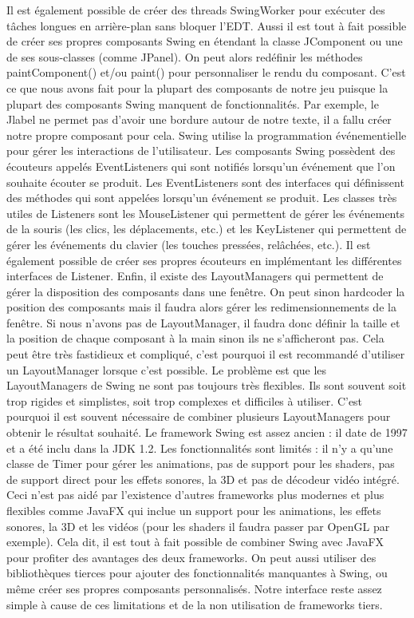 \documentclass{article}
\begin{document}
    Il est également possible de créer des threads SwingWorker pour exécuter des tâches longues en arrière-plan sans bloquer l'EDT.
    Aussi il est tout à fait possible de créer ses propres composants Swing en étendant la classe JComponent ou une de ses sous-classes (comme JPanel).
    On peut alors redéfinir les méthodes paintComponent() et/ou paint() pour personnaliser le rendu du composant.
    C'est ce que nous avons fait pour la plupart des composants de notre jeu puisque la plupart des composants Swing manquent de fonctionnalités.
    Par exemple, le Jlabel ne permet pas d'avoir une bordure autour de notre texte, il a fallu créer notre propre composant pour cela.
    \newline
    Swing utilise la programmation événementielle pour gérer les interactions de l'utilisateur.
    Les composants Swing possèdent des écouteurs appelés EventListeners qui sont notifiés lorsqu'un événement que l'on souhaite écouter se produit.
    Les EventListeners sont des interfaces qui définissent des méthodes qui sont appelées lorsqu'un événement se produit.
    Les classes très utiles de Listeners sont les MouseListener qui permettent de gérer les événements de la souris (les clics, les déplacements, etc.) et les KeyListener qui permettent de gérer les événements du clavier (les touches pressées, relâchées, etc.).
    Il est également possible de créer ses propres écouteurs en implémentant les différentes interfaces de Listener.
    \newline
    Enfin, il existe des LayoutManagers qui permettent de gérer la disposition des composants dans une fenêtre.
    On peut sinon hardcoder la position des composants mais il faudra alors gérer les redimensionnements de la fenêtre.
    Si nous n'avons pas de LayoutManager, il faudra donc définir la taille et la position de chaque composant à la main sinon ils ne s'afficheront pas.
    Cela peut être très fastidieux et compliqué, c'est pourquoi il est recommandé d'utiliser un LayoutManager lorsque c'est possible.
    Le problème est que les LayoutManagers de Swing ne sont pas toujours très flexibles.
    Ils sont souvent soit trop rigides et simplistes, soit trop complexes et difficiles à utiliser.
    C'est pourquoi il est souvent nécessaire de combiner plusieurs LayoutManagers pour obtenir le résultat souhaité.
    \newline
    Le framework Swing est assez ancien : il date de 1997 et a été inclu dans la JDK 1.2.
    Les fonctionnalités sont limités : il n'y a qu'une classe de Timer pour gérer les animations, pas de support pour les shaders, pas de support direct pour les effets sonores, la 3D et pas de décodeur vidéo intégré.
    Ceci n'est pas aidé par l'existence d'autres frameworks plus modernes et plus flexibles comme JavaFX qui inclue un support pour les animations, les effets sonores, la 3D et les vidéos (pour les shaders il faudra passer par OpenGL par exemple).
    Cela dit, il est tout à fait possible de combiner Swing avec JavaFX pour profiter des avantages des deux frameworks.
    On peut aussi utiliser des bibliothèques tierces pour ajouter des fonctionnalités manquantes à Swing, ou même créer ses propres composants personnalisés.
    Notre interface reste assez simple à cause de ces limitations et de la non utilisation de frameworks tiers.
\end{document}
